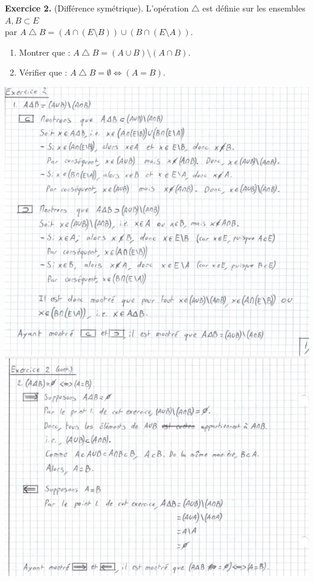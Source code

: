 \documentclass[a4paper, 10pt]{report}
\begin{document}
	\newpage
	
	\fancyhf{}
	\renewcommand{\headrule}
	{\rule{\textwidth}{0pt}}
	
	\noindent
	\textbf{Exercice 2.} (Différence symétrique). L'opération
	$\bigtriangleup$ est définie sur les ensembles $A, B \subset E$\\
	par $A \bigtriangleup B =
		(A \cap (E \setminus B)) \cup (B \cap (E \setminus A))$.
	
	\begin{enumerate}[label=\arabic*.]
		\item Montrer que : $A \bigtriangleup B =
			(A \cup B) \setminus (A \cap B)$.
		\item Vérifier que : $A \bigtriangleup B = \emptyset
			\iff (A = B)$.
	\end{enumerate}
	
	\includegraphics[scale=0.8]{02B - ex02.jpg}
	
\end{document}
